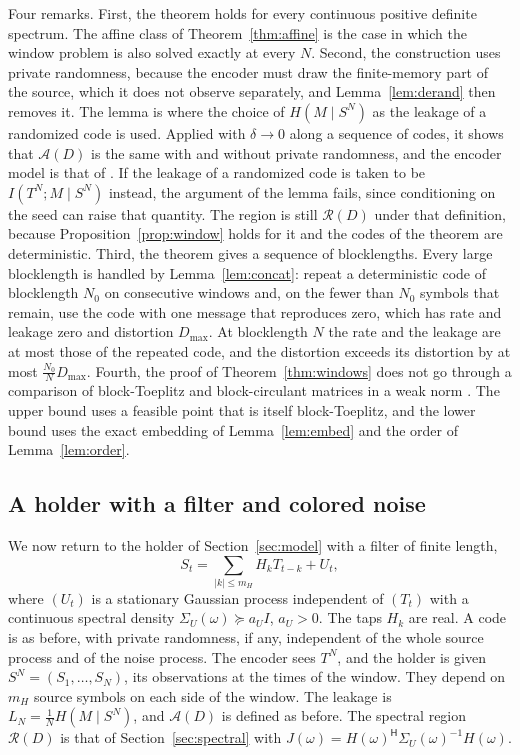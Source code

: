 \documentclass[11pt,onecolumn]{IEEEtran}
\newcommand{\herm}{\mathsf H}
\begin{document}
Four remarks. First, the theorem holds for every continuous positive
definite spectrum. The affine class of Theorem~\ref{thm:affine} is the
case in which the window problem is also solved exactly at every $N$.
Second, the construction uses private randomness, because the
encoder must draw the finite-memory part of the source, which it does
not observe separately, and Lemma~\ref{lem:derand} then removes it. The
lemma is where the choice of
$H(M\mid S^N)$ as the leakage of a randomized code is used. Applied
with $\delta\to0$ along a sequence of codes, it shows that
$\mathcal A(D)$ is the same with and without private randomness, and
the encoder model is that of \cite{part1}. If the leakage of a
randomized code is taken to be $I(T^N;M\mid S^N)$ instead, the argument
of the lemma fails, since conditioning on the seed can raise that
quantity. The region is still $\mathcal R(D)$
under that definition, because Proposition~\ref{prop:window} holds for
it and the codes of the theorem are deterministic. Third, the theorem
gives a sequence of
blocklengths. Every large blocklength is handled by Lemma~\ref{lem:concat}:
repeat a deterministic code of blocklength $N_0$ on consecutive windows
and, on the fewer than $N_0$ symbols that remain, use the code with one
message that reproduces zero, which has rate and leakage zero and
distortion $D_{\max}$. At blocklength $N$ the rate and the leakage are
at most those of the repeated code, and the distortion exceeds its
distortion by at most $\tfrac{N_0}ND_{\max}$. Fourth, the proof of Theorem~\ref{thm:windows} does not go
through a comparison of block-Toeplitz and block-circulant matrices in
a weak norm \cite{gutierrez2012}. The upper bound uses a feasible point
that is itself block-Toeplitz, and the lower bound uses the exact
embedding of Lemma~\ref{lem:embed} and the order of
Lemma~\ref{lem:order}.

\subsection{A holder with a filter and colored noise}
\label{sec:filter}

We now return to the holder of Section~\ref{sec:model} with a filter of
finite length,
\[
S_t=\sum_{|k|\le m_H}H_kT_{t-k}+U_t ,
\]
where $(U_t)$ is a stationary Gaussian process independent of $(T_t)$
with a continuous spectral density $\Sigma_U(\omega)\succeq a_UI$,
$a_U>0$. The taps $H_k$ are real. A code is as before, with private
randomness, if any, independent of the whole source process and of the
noise process. The encoder sees $T^N$, and the holder is
given $S^N=(S_1,\dots,S_N)$, its observations at the times of the
window. They depend on $m_H$ source symbols on each side of the window.
The leakage is $L_N=\tfrac1NH(M\mid S^N)$, and $\mathcal A(D)$ is defined
as before. The spectral region $\mathcal R(D)$ is that of
Section~\ref{sec:spectral} with
$J(\omega)=H(\omega)^{\herm}\Sigma_U(\omega)^{-1}H(\omega)$.
\end{document}
